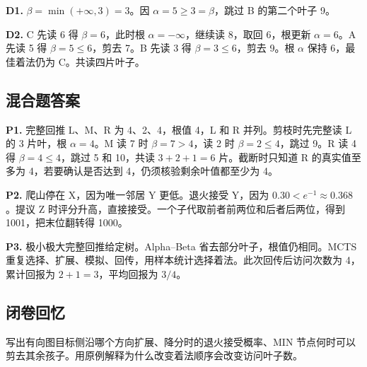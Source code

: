 \documentclass[UTF8,a4paper,11pt]{ctexart}
\begin{document}
\textbf{D1.} $\beta=\min(+\infty,3)=3$。因 $\alpha=5\ge3=\beta$，跳过 B 的第二个叶子 9。

\textbf{D2.} C 先读 6 得 $\beta=6$，此时根 $\alpha=-\infty$，继续读 8，取回 6，根更新 $\alpha=6$。A 先读 5 得 $\beta=5\le6$，剪去 7。B 先读 3 得 $\beta=3\le6$，剪去 9。根 $\alpha$ 保持 6，最佳着法仍为 C。共读四片叶子。

\clearpage
\subsection{混合题答案}
\textbf{P1.} 完整回推 L、M、R 为 4、2、4，根值 4，L 和 R 并列。剪枝时先完整读 L 的 3 片叶，根 $\alpha=4$。M 读 7 时 $\beta=7>4$，读 2 时 $\beta=2\le4$，跳过 9。R 读 4 得 $\beta=4\le4$，跳过 5 和 10，共读 $3+2+1=6$ 片。截断时只知道 R 的真实值至多为 4，若要确认是否达到 4，仍须核验剩余叶值都至少为 4。

\textbf{P2.} 爬山停在 X，因为唯一邻居 Y 更低。退火接受 Y，因为 $0.30<e^{-1}\approx0.368$。提议 Z 时评分升高，直接接受。一个子代取前者前两位和后者后两位，得到 1001，把末位翻转得 1000。

\textbf{P3.} 极小极大完整回推给定树。Alpha–Beta 省去部分叶子，根值仍相同。MCTS 重复选择、扩展、模拟、回传，用样本统计选择着法。此次回传后访问次数为 4，累计回报为 $2+1=3$，平均回报为 $3/4$。

\subsection{闭卷回忆}
写出有向图目标侧沿哪个方向扩展、降分时的退火接受概率、MIN 节点何时可以剪去其余孩子。用原例解释为什么改变着法顺序会改变访问叶子数。
\end{document}
